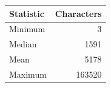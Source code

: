 \begin{tabular}{lr}
\toprule
\textbf{Statistic} & \textbf{Characters} \\
\midrule
Minimum & 3 \\
Median & 1591 \\
Mean & 5178 \\
Maximum & 163520 \\
\bottomrule
\end{tabular}
